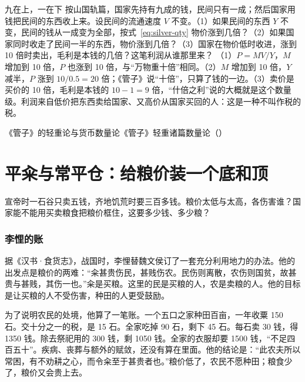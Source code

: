 \begin{example}{九在上，一在下}\label{ex:qinhan-nine}
按山国轨篇，国家先持有九成的钱，民间只有一成；然后国家用钱把民间的东西收上来。设民间的流通速度 $V$ 不变。（1）如果民间的东西 $Y$ 不变，民间的钱从一成变为全部，按式~\eqref{eq:silver-qty} 物价涨到几倍？（2）如果国家同时收走了民间一半的东西，物价涨到几倍？（3）国家在物价低时收进，涨到 10 倍时卖出，毛利是本钱的几倍？这笔利润从谁那里来？
\solution （1）$P=MV/Y$，$M$ 增加到 10 倍，$P$ 也涨到 10 倍，与“万物重十倍”相同。（2）$M$ 增加到 10 倍，$Y$ 减半，$P$ 涨到 $10/0.5=20$ 倍；《管子》说“十倍”，只算了钱的一边。（3）卖价是买价的 10 倍，毛利是本钱的 $10-1=9$ 倍，“什倍之利”说的大概就是这个数量级。利润来自低价把东西卖给国家、又高价从国家买回的人：这是一种不叫作税的税。
\end{example}

\begin{compare}{《管子》的轻重论与货币数量论}{《管子》轻重诸篇}{数量论（）}
\end{compare}

\section{平籴与常平仓：给粮价装一个底和顶}\label{sec:qinhan-granary}

宣帝时一石谷只卖五钱，齐地饥荒时要三百多钱。粮价太低与太高，各伤害谁？国家能不能用买卖粮食把粮价框住，这要多少钱、多少粮？

\subsubsection{李悝的账}
据《汉书·食货志》，战国时，李悝替魏文侯订了一套充分利用地力的办法\cite{hanshu}。他的出发点是粮价的两难：“籴甚贵伤民，甚贱伤农。民伤则离散，农伤则国贫，故甚贵与甚贱，其伤一也。”籴是买粮。这里的民是买粮的人，农是卖粮的人。他的目标是让买粮的人不受伤害，种田的人更受鼓励\cite{hanshu}。

为了说明农民的处境，他算了一笔账。一个五口之家种田百亩，一年收粟 150 石。交十分之一的税，是 15 石。全家吃掉 90 石，剩下 45 石。每石卖 30 钱，得 1350 钱。除去祭祀用的 300 钱，剩 1050 钱。全家的衣服却要 1500 钱，“不足四百五十”。疾病、丧葬与额外的赋敛，还没有算在里面。他的结论是：“此农夫所以常困，有不劝耕之心，而令籴至于甚贵者也。”\cite{hanshu}粮价低了，农民不愿种田；粮食少了，粮价又会贵上去。

